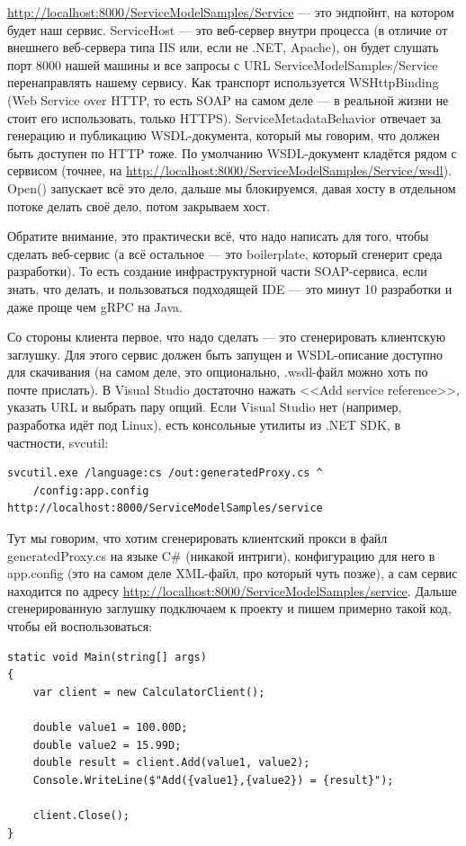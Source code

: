 \documentclass{../../text-style}
\begin{document}
\url{http://localhost:8000/ServiceModelSamples/Service} --- это эндпойнт, на котором будет наш сервис. ServiceHost --- это веб-сервер внутри процесса (в отличие от внешнего веб-сервера типа IIS или, если не .NET, Apache), он будет слушать порт 8000 нашей машины и все запросы с URL ServiceModelSamples/Service перенаправлять нашему сервису. Как транспорт используется WSHttpBinding (Web Service over HTTP, то есть SOAP на самом деле --- в реальной жизни не стоит его использовать, только HTTPS). ServiceMetadataBehavior отвечает за генерацию и публикацию WSDL-документа, который мы говорим, что должен быть доступен по HTTP тоже. По умолчанию WSDL-документ кладётся рядом с сервисом (точнее, на \url{http://localhost:8000/ServiceModelSamples/Service/wsdl}). Open() запускает всё это дело, дальше мы блокируемся, давая хосту в отдельном потоке делать своё дело, потом закрываем хост.

Обратите внимание, это практически всё, что надо написать для того, чтобы сделать веб-сервис (а всё остальное --- это boilerplate, который сгенерит среда разработки). То есть создание инфраструктурной части SOAP-сервиса, если знать, что делать, и пользоваться подходящей IDE --- это минут 10 разработки и даже проще чем gRPC на Java.

Со стороны клиента первое, что надо сделать --- это сгенерировать клиентскую заглушку. Для этого сервис должен быть запущен и WSDL-описание доступно для скачивания (на самом деле, это опционально, .wsdl-файл можно хоть по почте прислать). В Visual Studio достаточно нажать <<Add service reference>>, указать URL и выбрать пару опций. Если Visual Studio нет (например, разработка идёт под Linux), есть консольные утилиты из .NET SDK, в частности, svcutil:

\begin{verbatim}
svcutil.exe /language:cs /out:generatedProxy.cs ^
    /config:app.config http://localhost:8000/ServiceModelSamples/service
\end{verbatim}

Тут мы говорим, что хотим сгенерировать клиентский прокси в файл generatedProxy.cs на языке C\# (никакой интриги), конфигурацию для него в app.config (это на самом деле XML-файл, про который чуть позже), а сам сервис находится по адресу \url{http://localhost:8000/ServiceModelSamples/service}. Дальше сгенерированную заглушку подключаем к проекту и пишем примерно такой код, чтобы ей воспользоваться: 

\begin{verbatim}
static void Main(string[] args)
{
    var client = new CalculatorClient();

    double value1 = 100.00D;
    double value2 = 15.99D;
    double result = client.Add(value1, value2);
    Console.WriteLine($"Add({value1},{value2}) = {result}");

    client.Close();
}
\end{verbatim}
\end{document}
